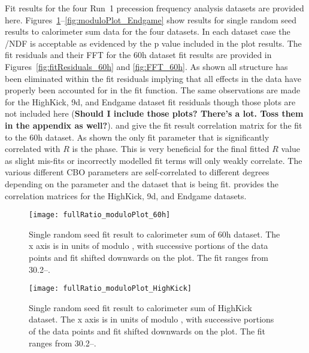 Fit results for the four Run~1 precession frequency analysis datasets are provided here. Figures~\ref{fig:moduloPlot_60h}--\ref{fig:moduloPlot_Endgame} show results for single random seed results to calorimeter sum data for the four datasets. In each dataset case the \chisq/NDF is acceptable as evidenced by the p value included in the plot results. The fit residuals and their FFT for the 60h dataset fit results are provided in Figures~\ref{fig:fitResiduals_60h} and \ref{fig:FFT_60h}. As shown all structure has been eliminated within the fit residuals implying that all effects in the data have properly been accounted for in the fit function. The same observations are made for the HighKick, 9d, and Endgame dataset fit residuals though those plots are not included here (\textbf{Should I include those plots? There's a lot. Toss them in the appendix as well?}).  and  give the fit result correlation matrix for the fit to the 60h dataset. As shown the only fit parameter that is significantly correlated with $R$ is the \gmtwo phase. This is very beneficial for the final fitted $R$ value as slight mis-fits or incorrectly modelled fit terms will only weakly correlate. The various different CBO parameters are self-correlated to different degrees depending on the parameter and the dataset that is being fit.  provides the correlation matrices for the HighKick, 9d, and Endgame datasets.



\begin{figure}[]
    \centering
    \texttt{[image: fullRatio\_moduloPlot\_60h]}
    \caption[60h dataset calorimter sum fit result]{Single random seed fit result to calorimeter sum of 60h dataset. The x axis is in units of \mus{} modulo , with successive portions of the data points and fit shifted downwards on the plot. The fit ranges from 30.2--.}
    \label{fig:moduloPlot_60h}
\end{figure}


\begin{figure}[]
    \centering
    \texttt{[image: fullRatio\_moduloPlot\_HighKick]}
    \caption[HighKick dataset calorimter sum fit result]{Single random seed fit result to calorimeter sum of HighKick dataset. The x axis is in units of \mus{} modulo , with successive portions of the data points and fit shifted downwards on the plot. The fit ranges from 30.2--.}
    \label{fig:moduloPlot_HighKick}
\end{figure}

